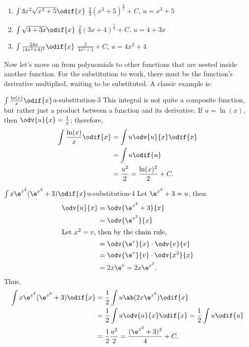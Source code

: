 \begin{enumerate}
	\item $\int 3x^2\sqrt{x^3 + 5}\odif{x}$ \hfill $\frac{2}{3}(x^3 + 5)^{\frac{3}{2}} + C$, $u = x^3 + 5$
	\item $\int \sqrt{4 + 3x}\odif{x}$ \hfill $\frac{2}{9}(3x + 4)^{\frac{3}{2}} + C$, $u = 4 + 3x$
	\item $\int \frac{24x}{(4x^2 + 4)^2}\odif{x}$ \hfill $\frac{3}{4x^2 + 4} + C$, $u = 4x^2 + 4$
\end{enumerate}

Now let's move on from polynomials to other functions that are nested inside another function. For the substitution to work, there must be the function's derivative multiplied, waiting to be substituted. A classic example is:
\begin{exmp}{$\int \frac{\ln(x)}{x}\odif{x}$}{u-substitution-3}
	This integral is not quite a composite function, but rather just a product between a function and its derivative. If $u = \ln(x)$, then $\odv{u}{x} = \frac{1}{x}$; therefore,
	\begin{align}
		\int \frac{\ln(x)}{x}\odif{x} & = \int u\odv{u}{x}\odif{x}                 \\
		                              & = \int u\odif{u}                           \\
		                              & = \frac{u^2}{2} = \frac{\ln(x)^2}{2} + C.
	\end{align}
\end{exmp}

\begin{exmp}{$\int x\e^{x^2}(\e^{x^2} + 3)\odif{x}$}{u-substitution-4}
	Let $\e^{x^2} + 3 = u$, then
	\begin{align}
		\odv{u}{x} & = \odv{\e^{x^2} + 3}{x}            \\
		           & = \odv{\e^{x^2}}{x}                \\
		\intertext{Let $x^2 = v$, then by the chain rule,}
		           & = \odv{\e^v}{x} \cdot \odv{v}{v}   \\
		           & = \odv{\e^v}{v} \cdot \odv{x^2}{x} \\
		           & = 2x\e^v = 2x\e^{x^2}.
	\end{align}
	Thus,
	\begin{align}
		\int x\e^{x^2}(\e^{x^2} + 3)\odif{x} & = \frac{1}{2}\int u\ab(2x\e^{x^2})\odif{x}                        \\
		                                     & = \frac{1}{2}\int u\odv{u}{x}\odif{x} = \frac{1}{2}\int u\odif{u} \\
		                                     & = \frac{1}{2}\frac{u^2}{2} = \frac{(\e^{x^2} + 3)^2}{4} + C.
	\end{align}
\end{exmp}


